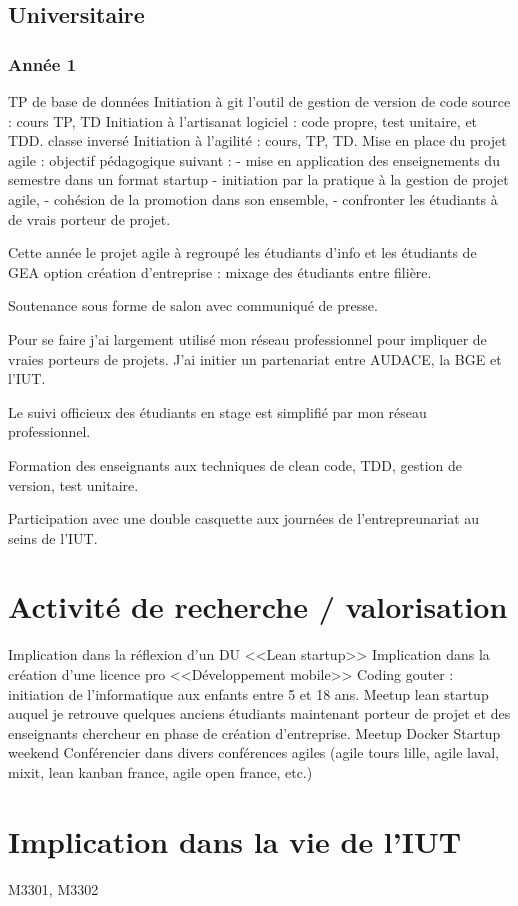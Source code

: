 \documentclass[a4paper]{article}
\begin{document}
\subsection{Universitaire}
\subsubsection{Année 1}

TP de base de données
Initiation à git l'outil de gestion de version de code source : cours TP, TD
Initiation à l'artisanat logiciel : code propre, test unitaire, et TDD.
classe inversé
Initiation à l'agilité : cours, TP, TD.
Mise en place du projet agile : objectif pédagogique suivant : 
- mise en application des enseignements du semestre dans un format startup
- initiation par la pratique à la gestion de projet agile, 
- cohésion de la promotion dans son ensemble,
- confronter les étudiants à de vrais porteur de projet.

Cette année le projet agile à regroupé les étudiants d'info et les étudiants de GEA option création d'entreprise : mixage des étudiants entre filière.

Soutenance sous forme de salon avec communiqué de presse.

Pour se faire j'ai largement utilisé mon réseau professionnel pour impliquer de vraies porteurs de projets. 
J'ai initier un partenariat entre AUDACE, la BGE et l'IUT.

Le suivi officieux des étudiants en stage est simplifié par mon réseau professionnel.

Formation des enseignants aux techniques de clean code, TDD, gestion de version, test unitaire.

Participation avec une double casquette aux journées de l'entrepreunariat au seins de l'IUT.

\section{Activité de recherche / valorisation}


Implication dans la réflexion d'un DU <<Lean startup>>
Implication dans la création d'une licence pro <<Développement mobile>> 
Coding gouter : initiation de l'informatique aux enfants entre 5 et 18 ans.
Meetup lean startup auquel je retrouve quelques anciens étudiants maintenant porteur de projet et des enseignants chercheur en phase de création d'entreprise.
Meetup Docker
Startup weekend
Conférencier dans divers conférences agiles (agile tours lille, agile laval, mixit, lean kanban france, agile open france, etc.)

\section{Implication dans la vie de l'IUT}
M3301, M3302
\end{document}
